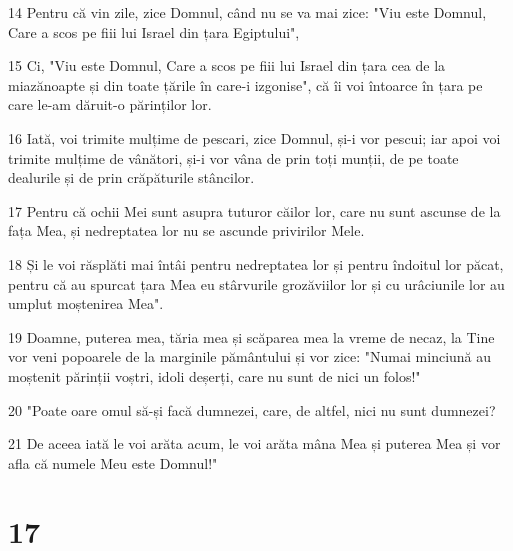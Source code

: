 \par 14 Pentru că vin zile, zice Domnul, când nu se va mai zice: "Viu este Domnul, Care a scos pe fiii lui Israel din țara Egiptului",
\par 15 Ci, "Viu este Domnul, Care a scos pe fiii lui Israel din țara cea de la miazănoapte și din toate țările în care-i izgonise", că îi voi întoarce în țara pe care le-am dăruit-o părinților lor.
\par 16 Iată, voi trimite mulțime de pescari, zice Domnul, și-i vor pescui; iar apoi voi trimite mulțime de vânători, și-i vor vâna de prin toți munții, de pe toate dealurile și de prin crăpăturile stâncilor.
\par 17 Pentru că ochii Mei sunt asupra tuturor căilor lor, care nu sunt ascunse de la fața Mea, și nedreptatea lor nu se ascunde privirilor Mele.
\par 18 Și le voi răsplăti mai întâi pentru nedreptatea lor și pentru îndoitul lor păcat, pentru că au spurcat țara Mea eu stârvurile grozăviilor lor și cu urâciunile lor au umplut moștenirea Mea".
\par 19 Doamne, puterea mea, tăria mea și scăparea mea la vreme de necaz, la Tine vor veni popoarele de la marginile pământului și vor zice: "Numai minciună au moștenit părinții voștri, idoli deșerți, care nu sunt de nici un folos!"
\par 20 "Poate oare omul să-și facă dumnezei, care, de altfel, nici nu sunt dumnezei?
\par 21 De aceea iată le voi arăta acum, le voi arăta mâna Mea și puterea Mea și vor afla că numele Meu este Domnul!"

\chapter{17}

